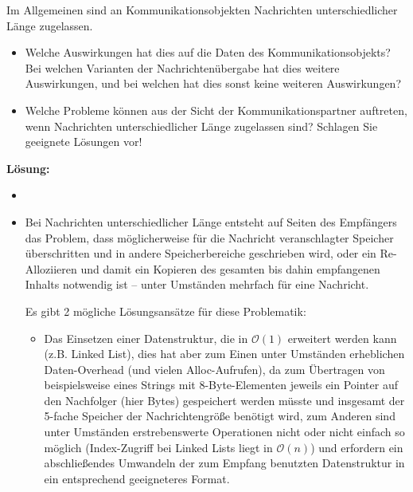 

\begin{description}

Im Allgemeinen sind an Kommunikationsobjekten Nachrichten unterschiedlicher Länge zugelassen.
    \begin{itemize}
      \item Welche Auswirkungen hat dies auf die Daten des Kommunikationsobjekts? Bei welchen Varianten der Nachrichtenübergabe hat dies weitere Auswirkungen, und bei welchen hat dies sonst keine weiteren Auswirkungen?
      \item Welche Probleme können aus der Sicht der Kommunikationspartner auftreten, wenn Nachrichten unterschiedlicher Länge zugelassen sind? Schlagen Sie geeignete Lösungen vor!
    \end{itemize}

\textbf{Lösung:}
    \begin{itemize}
      \item
      \item Bei Nachrichten unterschiedlicher Länge entsteht auf Seiten des Empfängers das Problem, dass möglicherweise für die Nachricht veranschlagter Speicher überschritten und in andere Speicherbereiche geschrieben wird, oder ein Re-Alloziieren und damit ein Kopieren des gesamten bis dahin empfangenen Inhalts notwendig ist -- unter Umständen mehrfach für eine Nachricht.

        Es gibt 2 mögliche Lösungsansätze für diese Problematik:
        \begin{itemize}
          \item Das Einsetzen einer Datenstruktur, die in $\mathcal{O}(1)$ erweitert werden kann (z.B. Linked List), dies hat aber zum Einen unter Umständen erheblichen Daten-Overhead (und vielen Alloc-Aufrufen), da zum Übertragen von beispielsweise eines Strings mit 8-Byte-Elementen jeweils ein Pointer auf den Nachfolger (hier  Bytes) gespeichert werden müsste und insgesamt der 5-fache Speicher der Nachrichtengröße benötigt wird, zum Anderen sind unter Umständen erstrebenswerte Operationen nicht oder nicht einfach so möglich (Index-Zugriff bei Linked Lists liegt in $\mathcal{O}(n)$) und erfordern ein abschließendes Umwandeln der zum Empfang benutzten Datenstruktur in ein entsprechend geeigneteres Format.


\end{itemize}
\end{itemize}
\end{description}
